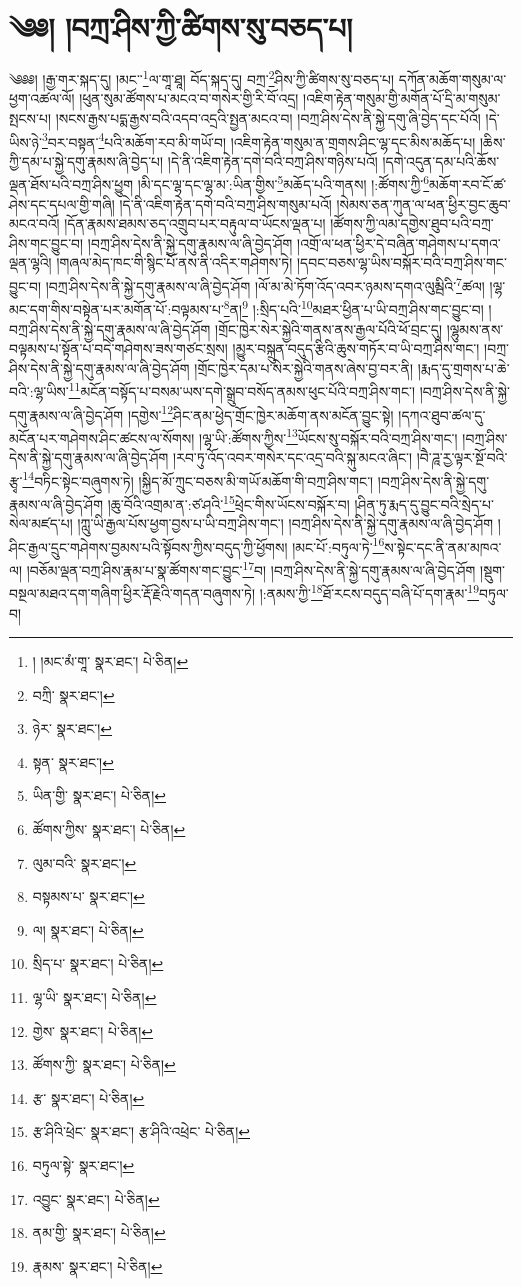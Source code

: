 \setcounter{footnote}{0} 
\chapter{༄༅། །བཀྲ་ཤིས་ཀྱི་ཚིགས་སུ་བཅད་པ།}༄༅༅། །རྒྱ་གར་སྐད་དུ། །མང་་\footnote{། །མང་མཾ་གཱ་  སྣར་ཐང་།  པེ་ཅིན། }ལ་གཱ་ཐཱ། བོད་སྐད་དུ། བཀྲ་\footnote{བཀྲི་  སྣར་ཐང་། }ཤིས་ཀྱི་ཚིགས་སུ་བཅད་པ། དཀོན་མཆོག་གསུམ་ལ་ཕྱག་འཚལ་ལོ། །ཕུན་སུམ་ཚོགས་པ་མངའ་བ་གསེར་གྱི་རི་བོ་འདྲ། །འཇིག་རྟེན་གསུམ་གྱི་མགོན་པོ་དྲི་མ་གསུམ་སྤངས་པ། །སངས་རྒྱས་པདྨ་རྒྱས་བའི་འདབ་འདྲའི་སྤྱན་མངའ་བ། །བཀྲ་ཤིས་དེས་ནི་སྐྱེ་དགུ་ཞི་བྱེད་དང་པོའོ། །དེ་ཡིས་ཉེ་\footnote{ཉེར་  སྣར་ཐང་། }བར་བསྟན་\footnote{སྟན་  སྣར་ཐང་། }པའི་མཆོག་རབ་མི་གཡོ་བ། །འཇིག་རྟེན་གསུམ་ན་གྲགས་ཤིང་ལྷ་དང་མིས་མཆོད་པ། །ཆིས་ཀྱི་དམ་པ་སྐྱེ་དགུ་རྣམས་ཞི་བྱེད་པ། །དེ་ནི་འཇིག་རྟེན་དགེ་བའི་བཀྲ་ཤིས་གཉིས་པའོ། །དགེ་འདུན་དམ་པའི་ཆོས་ལྡན་ཐོས་པའི་བཀྲ་ཤིས་ཕྱུག །མི་དང་ལྷ་དང་ལྷ་མ་:ཡིན་གྱིས་\footnote{ཡིན་གྱི་  སྣར་ཐང་།  པེ་ཅིན། }མཆོད་པའི་གནས། །:ཚོགས་ཀྱི་\footnote{ཚོགས་ཀྱིས་  སྣར་ཐང་།  པེ་ཅིན། }མཆོག་རབ་ངོ་ཚ་ཤེས་དང་དཔལ་གྱི་གཞི། །དེ་ནི་འཇིག་རྟེན་དགེ་བའི་བཀྲ་ཤིས་གསུམ་པའོ། །སེམས་ཅན་ཀུན་ལ་ཕན་ཕྱིར་བྱང་ཆུབ་མངའ་བའོ། །དོན་རྣམས་ཐམས་ཅད་འགྲུབ་པར་བརྟུལ་བ་ཡོངས་ལྡན་པ། །ཚོགས་ཀྱི་ལམ་དགྱེས་ཐུབ་པའི་བཀྲ་ཤིས་གང་བྱུང་བ། །བཀྲ་ཤིས་དེས་ནི་སྐྱེ་དགུ་རྣམས་ལ་ཞི་བྱེད་ཤོག །འགྲོ་ལ་ཕན་ཕྱིར་དེ་བཞིན་གཤེགས་པ་དགའ་ལྡན་ལྷའི། །གཞལ་མེད་ཁང་གི་སྙིང་པོ་ནས་ནི་འདིར་གཤེགས་ཏེ། །དབང་བཅས་ལྷ་ཡིས་བསྐོར་བའི་བཀྲ་ཤིས་གང་བྱུང་བ། །བཀྲ་ཤིས་དེས་ནི་སྐྱེ་དགུ་རྣམས་ལ་ཞི་བྱེད་ཤོག །ལོ་མ་མེ་ཏོག་འོད་འབར་ཉམས་དགའ་ལུམྦིའི་\footnote{ལུམ་བའི་  སྣར་ཐང་། }ཚལ། །ལྷ་མང་དག་གིས་བསྟེན་པར་མགོན་པོ་:བལྟམས་པ་\footnote{བསྟམས་པ་  སྣར་ཐང་། }ན།\footnote{ལ།  སྣར་ཐང་།  པེ་ཅིན། } །:སྲིད་པའི་\footnote{སྲིད་པ་  སྣར་ཐང་།  པེ་ཅིན། }མཐར་ཕྱིན་པ་ཡི་བཀྲ་ཤིས་གང་བྱུང་བ། །བཀྲ་ཤིས་དེས་ནི་སྐྱེ་དགུ་རྣམས་ལ་ཞི་བྱེད་ཤོག །གྲོང་ཁྱེར་སེར་སྐྱེའི་གནས་ནས་རྒྱལ་པོའི་ཕོ་བྲང་དུ། །ལྷུམས་ནས་བལྟམས་པ་སྟོན་པ་བདེ་གཤེགས་ཟས་གཙང་སྲས། །མྱུར་བསྐྲུན་བདུད་རྩིའི་ཆུས་གཏོར་བ་ཡི་བཀྲ་ཤིས་གང་། །བཀྲ་ཤིས་དེས་ནི་སྐྱེ་དགུ་རྣམས་ལ་ཞི་བྱེད་ཤོག །གྲོང་ཁྱེར་དམ་པ་སེར་སྐྱེའི་གནས་ཞེས་བྱ་བར་ནི། །རྨད་དུ་གྲགས་པ་ཆེ་བའི་:ལྷ་ཡིས་\footnote{ལྷ་ཡི་  སྣར་ཐང་།  པེ་ཅིན། }མངོན་བསྟོད་པ་བསམ་ཡས་དགེ་སྒྲུབ་བསོད་ནམས་ཕུང་པོའི་བཀྲ་ཤིས་གང་། །བཀྲ་ཤིས་དེས་ནི་སྐྱེ་དགུ་རྣམས་ལ་ཞི་བྱེད་ཤོག །དགྱེས་\footnote{གྱེས་  སྣར་ཐང་།  པེ་ཅིན། }ཤིང་ནམ་ཕྱེད་གྲོང་ཁྱེར་མཆོག་ནས་མངོན་བྱུང་སྟེ། །དཀའ་ཐུབ་ཚལ་དུ་མངོན་པར་གཤེགས་ཤིང་ཚངས་ལ་སོགས། །ལྷ་ཡི་:ཚོགས་ཀྱིས་\footnote{ཚོགས་ཀྱི་  སྣར་ཐང་།  པེ་ཅིན། }ཡོངས་སུ་བསྐོར་བའི་བཀྲ་ཤིས་གང་། །བཀྲ་ཤིས་དེས་ནི་སྐྱེ་དགུ་རྣམས་ལ་ཞི་བྱེད་ཤོག །རབ་ཏུ་འོད་འབར་གསེར་དང་འདྲ་བའི་སྐུ་མངའ་ཞིང་། །བཻ་ཌཱ་རྱ་ལྟར་སྔོ་བའི་རྩྭ་\footnote{རྩ་  སྣར་ཐང་།  པེ་ཅིན། }བཏིང་སྟེང་བཞུགས་ཏེ། །སྐྱིད་མོ་ཀྲུང་བཅས་མི་གཡོ་མཆོག་གི་བཀྲ་ཤིས་གང་། །བཀྲ་ཤིས་དེས་ནི་སྐྱེ་དགུ་རྣམས་ལ་ཞི་བྱེད་ཤོག །ཆུ་བོའི་འགྲམ་ན་:ཙ་ཤའི་\footnote{རྩ་ཤིའི་ཕྲེང་  སྣར་ཐང་། རྩ་ཤིའི་འཕྲེང་  པེ་ཅིན། }ཕྲེང་གིས་ཡོངས་བསྐོར་བ། །ཤིན་ཏུ་རྨད་དུ་བྱུང་བའི་སྲེད་པ་སེལ་མཛད་པ། །ཀླུ་ཡི་རྒྱལ་པོས་ཕྱག་བྱས་པ་ཡི་བཀྲ་ཤིས་གང་། །བཀྲ་ཤིས་དེས་ནི་སྐྱེ་དགུ་རྣམས་ལ་ཞི་བྱེད་ཤོག །ཤིང་རྒྱལ་དྲུང་གཤེགས་བྱམས་པའི་སྟོབས་ཀྱིས་བདུད་ཀྱི་ཕྱོགས། །མང་པོ་:བཏུལ་ཏེ་\footnote{བཏུལ་སྟེ་  སྣར་ཐང་། }ས་སྟེང་དང་ནི་ནམ་མཁའ་ལ། །བཅོམ་ལྡན་བཀྲ་ཤིས་རྣམ་པ་སྣ་ཚོགས་གང་བྱུང་\footnote{འབྱུང་  སྣར་ཐང་།  པེ་ཅིན། }བ། །བཀྲ་ཤིས་དེས་ནི་སྐྱེ་དགུ་རྣམས་ལ་ཞི་བྱེད་ཤོག །སྡུག་བསྔལ་མཐའ་དག་གཞིག་ཕྱིར་རྡོ་རྗེའི་གདན་བཞུགས་ཏེ། །:ནམས་ཀྱི་\footnote{ནམ་གྱི་  སྣར་ཐང་།  པེ་ཅིན། }ཐོ་རངས་བདུད་བཞི་པོ་དག་རྣམ་\footnote{རྣམས་  སྣར་ཐང་།  པེ་ཅིན། }བཏུལ་བ། 